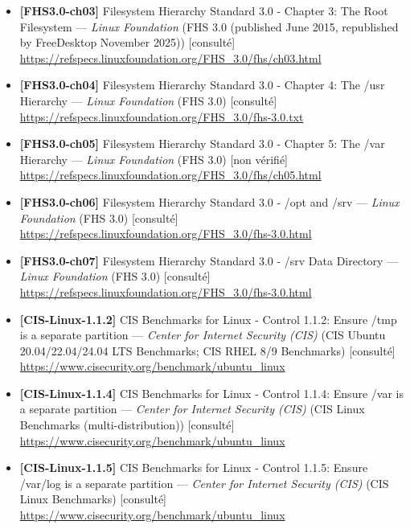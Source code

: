 \documentclass[10pt,a4paper]{article}
\begin{document}
\begin{itemize}[leftmargin=1.6em]
\item \textbf{[FHS3.0-ch03]} Filesystem Hierarchy Standard 3.0 - Chapter 3: The Root Filesystem --- \textit{Linux Foundation} (FHS 3.0 (published June 2015, republished by FreeDesktop November 2025)) \textcolor{cOk}{[consult\'e]}\\ \url{https://refspecs.linuxfoundation.org/FHS_3.0/fhs/ch03.html}
\item \textbf{[FHS3.0-ch04]} Filesystem Hierarchy Standard 3.0 - Chapter 4: The /usr Hierarchy --- \textit{Linux Foundation} (FHS 3.0) \textcolor{cOk}{[consult\'e]}\\ \url{https://refspecs.linuxfoundation.org/FHS_3.0/fhs-3.0.txt}
\item \textbf{[FHS3.0-ch05]} Filesystem Hierarchy Standard 3.0 - Chapter 5: The /var Hierarchy --- \textit{Linux Foundation} (FHS 3.0) \textcolor{cMed}{[non v\'erifi\'e]}\\ \url{https://refspecs.linuxfoundation.org/FHS_3.0/fhs/ch05.html}
\item \textbf{[FHS3.0-ch06]} Filesystem Hierarchy Standard 3.0 - /opt and /srv --- \textit{Linux Foundation} (FHS 3.0) \textcolor{cOk}{[consult\'e]}\\ \url{https://refspecs.linuxfoundation.org/FHS_3.0/fhs-3.0.html}
\item \textbf{[FHS3.0-ch07]} Filesystem Hierarchy Standard 3.0 - /srv Data Directory --- \textit{Linux Foundation} (FHS 3.0) \textcolor{cOk}{[consult\'e]}\\ \url{https://refspecs.linuxfoundation.org/FHS_3.0/fhs-3.0.html}
\item \textbf{[CIS-Linux-1.1.2]} CIS Benchmarks for Linux - Control 1.1.2: Ensure /tmp is a separate partition --- \textit{Center for Internet Security (CIS)} (CIS Ubuntu 20.04/22.04/24.04 LTS Benchmarks; CIS RHEL 8/9 Benchmarks) \textcolor{cOk}{[consult\'e]}\\ \url{https://www.cisecurity.org/benchmark/ubuntu_linux}
\item \textbf{[CIS-Linux-1.1.4]} CIS Benchmarks for Linux - Control 1.1.4: Ensure /var is a separate partition --- \textit{Center for Internet Security (CIS)} (CIS Linux Benchmarks (multi-distribution)) \textcolor{cOk}{[consult\'e]}\\ \url{https://www.cisecurity.org/benchmark/ubuntu_linux}
\item \textbf{[CIS-Linux-1.1.5]} CIS Benchmarks for Linux - Control 1.1.5: Ensure /var/log is a separate partition --- \textit{Center for Internet Security (CIS)} (CIS Linux Benchmarks) \textcolor{cOk}{[consult\'e]}\\ \url{https://www.cisecurity.org/benchmark/ubuntu_linux}

\end{itemize}
\end{document}
